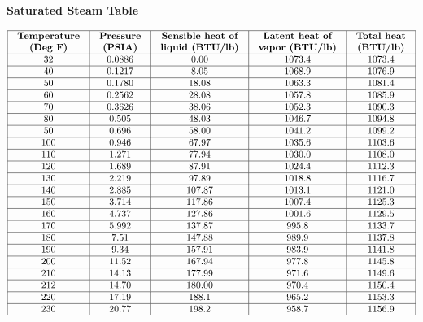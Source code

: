 


\centerline{\bf Saturated Steam Table}

$$\vbox{\offinterlineskip
\halign{\strut
\vrule \quad\hfil # \ \hfil & 
\vrule \quad\hfil # \ \hfil & 
\vrule \quad\hfil # \ \hfil & 
\vrule \quad\hfil # \ \hfil & 
\vrule \quad\hfil # \ \hfil \vrule \cr
\noalign{\hrule}
%
{\bf Temperature} & {\bf Pressure} & {\bf Sensible heat of} & {\bf Latent heat of} & {\bf Total heat} \cr
{\bf (Deg F)} & {\bf (PSIA)} & {\bf liquid (BTU/lb)} & {\bf vapor (BTU/lb)} & {\bf (BTU/lb)} \cr
%
\noalign{\hrule}
%
32 & 0.0886 & 0.00 & 1073.4 & 1073.4 \cr
%
\noalign{\hrule}
%
40 & 0.1217 & 8.05 & 1068.9 & 1076.9 \cr
%
\noalign{\hrule}
%
50 & 0.1780 & 18.08 & 1063.3 & 1081.4 \cr
%
\noalign{\hrule}
%
60 & 0.2562 & 28.08 & 1057.8 & 1085.9 \cr
%
\noalign{\hrule}
%
70 & 0.3626 & 38.06 & 1052.3 & 1090.3 \cr
%
\noalign{\hrule}
%
80 & 0.505 & 48.03 & 1046.7 & 1094.8 \cr
%
\noalign{\hrule}
%
50 & 0.696 & 58.00 & 1041.2 & 1099.2 \cr
%
\noalign{\hrule}
%
100 & 0.946 & 67.97 & 1035.6 & 1103.6 \cr
%
\noalign{\hrule}
%
110 & 1.271 & 77.94 & 1030.0 & 1108.0 \cr
%
\noalign{\hrule}
%
120 & 1.689 & 87.91 & 1024.4 & 1112.3 \cr
%
\noalign{\hrule}
%
130 & 2.219 & 97.89 & 1018.8 & 1116.7 \cr
%
\noalign{\hrule}
%
140 & 2.885 & 107.87 & 1013.1 & 1121.0 \cr
%
\noalign{\hrule}
%
150 & 3.714 & 117.86 & 1007.4 & 1125.3 \cr
%
\noalign{\hrule}
%
160 & 4.737 & 127.86 & 1001.6 & 1129.5 \cr
%
\noalign{\hrule}
%
170 & 5.992 & 137.87 & 995.8 & 1133.7 \cr
%
\noalign{\hrule}
%
180 & 7.51 & 147.88 & 989.9 & 1137.8 \cr
%
\noalign{\hrule}
%
190 & 9.34 & 157.91 & 983.9 & 1141.8 \cr
%
\noalign{\hrule}
%
200 & 11.52 & 167.94 & 977.8 & 1145.8 \cr
%
\noalign{\hrule}
%
210 & 14.13 & 177.99 & 971.6 & 1149.6 \cr
%
\noalign{\hrule}
%
212 & 14.70 & 180.00 & 970.4 & 1150.4 \cr
%
\noalign{\hrule}
%
220 & 17.19 & 188.1 & 965.2 & 1153.3 \cr
%
\noalign{\hrule}
%
230 & 20.77 & 198.2 & 958.7 & 1156.9 \cr
}}$$
